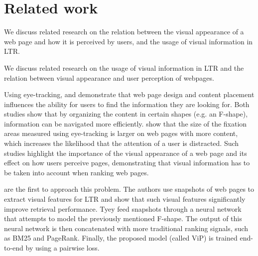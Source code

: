 
\section{Related work}
\label{sec:relatedwork}

We discuss related research on the relation between the visual appearance of a web page and how it is perceived by users, and the usage of visual information in \ac{LTR}.

We discuss related research on the usage of visual information in \ac{LTR} and the relation between visual appearance and user perception of webpages.


Using eye-tracking, \citet{nielsen2006f} and \citet{pernice2017f} demonstrate that web page design and content placement influences the ability for users to find the information they are looking for. 
Both studies show that by organizing the content in certain shapes (e.g. an F-shape), information can be  navigated more efficiently.
\citet{wang2014eye} show that the size of the fixation areas measured using eye-tracking is larger on web pages with more content, which increases the likelihood that the attention of a user is distracted.
Such studies highlight the importance of the visual appearance of a web page and its effect on how users perceive pages, demonstrating that visual information has to be taken into account when ranking web pages.

\citet{fan2017learning} are the first to approach this problem.
The authors use snapshots of web pages to extract visual features for LTR
and show that such visual features significantly improve retrieval performance.
Tyey feed snapshots through a neural network that attempts to model the previously mentioned F-shape.
The output of this neural network is then concatenated with more traditional ranking signals, such as BM25 and PageRank.
Finally, the proposed model (called ViP) is trained end-to-end by using a pairwise loss.

